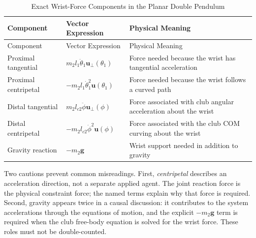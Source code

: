\documentclass[
  letterpaper,
]{report}
\begin{document}
\begin{longtable}[]{@{}
  >{\raggedright\arraybackslash}p{}
  >{\raggedright\arraybackslash}p{}
  >{\raggedright\arraybackslash}p{}@{}}
\caption{Exact Wrist-Force Components in the Planar Double
Pendulum}\label{tbl-force-components}\tabularnewline
\toprule\noalign{}
\begin{minipage}[b]{\linewidth}\raggedright
Component
\end{minipage} & \begin{minipage}[b]{\linewidth}\raggedright
Vector Expression
\end{minipage} & \begin{minipage}[b]{\linewidth}\raggedright
Physical Meaning
\end{minipage} \\
\midrule\noalign{}
\endfirsthead
\toprule\noalign{}
\begin{minipage}[b]{\linewidth}\raggedright
Component
\end{minipage} & \begin{minipage}[b]{\linewidth}\raggedright
Vector Expression
\end{minipage} & \begin{minipage}[b]{\linewidth}\raggedright
Physical Meaning
\end{minipage} \\
\midrule\noalign{}
\endhead
\bottomrule\noalign{}
\endlastfoot
Proximal tangential & \(m_2l_1\ddot\theta_1\mathbf u_\perp(\theta_1)\) &
Force needed because the wrist has tangential acceleration \\
Proximal centripetal & \(-m_2l_1\dot\theta_1^2\mathbf u(\theta_1)\) &
Force needed because the wrist follows a curved path \\
Distal tangential & \(m_2l_{c2}\ddot\phi\mathbf u_\perp(\phi)\) & Force
associated with club angular acceleration about the wrist \\
Distal centripetal & \(-m_2l_{c2}\dot\phi^2\mathbf u(\phi)\) & Force
associated with the club COM curving about the wrist \\
Gravity reaction & \(-m_2\mathbf g\) & Wrist support needed in addition
to gravity \\
\end{longtable}

Two cautions prevent common misreadings. First, \emph{centripetal}
describes an acceleration direction, not a separate applied agent. The
joint reaction force is the physical constraint force; the named terms
explain why that force is required. Second, gravity appears twice in a
causal discussion: it contributes to the system accelerations through
the equations of motion, and the explicit \(-m_2\mathbf g\) term is
required when the club free-body equation is solved for the wrist force.
These roles must not be double-counted.
\end{document}
